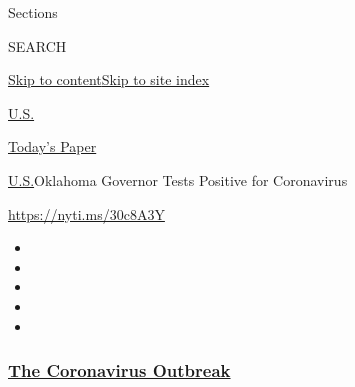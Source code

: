 Sections

SEARCH

\protect\hyperlink{site-content}{Skip to
content}\protect\hyperlink{site-index}{Skip to site index}

\href{https://www.nytimes3xbfgragh.onion/section/us}{U.S.}

\href{https://myaccount.nytimes3xbfgragh.onion/auth/login?response_type=cookie\&client_id=vi}{}

\href{https://www.nytimes3xbfgragh.onion/section/todayspaper}{Today's
Paper}

\href{/section/us}{U.S.}\textbar{}Oklahoma Governor Tests Positive for
Coronavirus

\url{https://nyti.ms/30c8A3Y}

\begin{itemize}
\item
\item
\item
\item
\item
\end{itemize}

\hypertarget{the-coronavirus-outbreak}{%
\subsubsection{\texorpdfstring{\href{https://www.nytimes3xbfgragh.onion/news-event/coronavirus?name=styln-coronavirus-national\&region=TOP_BANNER\&variant=undefined\&block=storyline_menu_recirc\&action=click\&pgtype=Article\&impression_id=6b5ff590-e393-11ea-a514-19f42751590e}{The
Coronavirus
Outbreak}}{The Coronavirus Outbreak}}\label{the-coronavirus-outbreak}}

